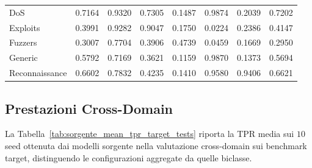 \begin{table}[H]
{\begin{tabular}{lccccccc}
        DoS            & 0.7164 & 0.9320 & 0.7305 & 0.1487 & 0.9874 & 0.2039 & 0.7202 \\
        Exploits       & 0.3991 & 0.9282 & 0.9047 & 0.1750 & 0.0224 & 0.2386 & 0.4147 \\
        Fuzzers        & 0.3007 & 0.7704 & 0.3906 & 0.4739 & 0.0459 & 0.1669 & 0.2950 \\
        Generic        & 0.5792 & 0.7169 & 0.3621 & 0.1159 & 0.9870 & 0.1373 & 0.5694 \\
        Reconnaissance & 0.6602 & 0.7832 & 0.4235 & 0.1410 & 0.9580 & 0.9406 & 0.6621 \\
        \bottomrule
    \end{tabular}
    }
\end{table}


\subsection{Prestazioni Cross-Domain}

La Tabella~\ref{tab:sorgente_mean_tpr_target_tests} riporta la TPR media sui $10$ seed ottenuta dai modelli sorgente nella valutazione cross-domain sui benchmark target, distinguendo le configurazioni aggregate da quelle biclasse.

